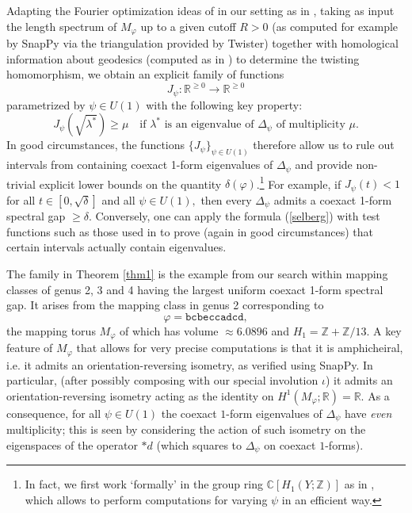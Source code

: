 \documentclass[11pt]{amsart}
\theoremstyle{definition}
\theoremstyle{remark}
\begin{document}
Adapting the Fourier optimization ideas of \cite{BS} in our setting as in \cite{LL1}, taking as input the length spectrum of $M_\varphi$ up to a given cutoff $R>0$ (as computed for example by SnapPy via the triangulation provided by Twister) together with homological information about geodesics (computed as in \cite{LL2}) to determine the twisting homomorphism, we obtain an explicit family of functions
\begin{equation*}
J_{\psi}:\mathbb{R}^{\geq0}\rightarrow \mathbb{R}^{\geq0}
\end{equation*}
parametrized by $\psi\in U(1)$ with the following key property:
\begin{equation*}
J_{\psi}(\sqrt{\lambda^*})\geq \mu\quad \text{if $\lambda^*$ is an eigenvalue of $\Delta_\psi$ of multiplicity $\mu$.}
\end{equation*}
In good circumstances, the functions $\{J_{\psi}\}_{\psi \in U(1)}$ therefore allow us to rule out intervals from containing coexact 1-form eigenvalues of $\Delta_\psi$ and provide non-trivial explicit lower bounds on the quantity $\delta(\varphi)$.\footnote{In fact, we first work `formally' in the group ring $\mathbb{C}[H_1(Y;\mathbb{Z})]$ as in \cite{LL4}, which allows to perform computations for varying $\psi$ in an efficient way.} For example, if $J_\psi(t) < 1$ for all $t \in [0,\sqrt{\delta}]$ and all $\psi \in U(1),$ then every $\Delta_\psi$ admits a coexact 1-form spectral gap $\geq \delta.$  Conversely, one can apply the formula (\ref{selberg}) with test functions such as those used in \cite{LL2} to prove (again in good circumstances) that certain intervals actually contain eigenvalues.
\\
\par
The family in Theorem \ref{thm1} is the example from our search within mapping classes of genus 2, 3 and 4 having the largest uniform coexact 1-form spectral gap. It arises from the mapping class in genus 2 corresponding to
\begin{equation*}
\varphi=\mathtt{bcbeccadcd},
\end{equation*}
the mapping torus $M_\varphi$ of which has volume $\approx 6.0896$ {and} $H_1=\mathbb{Z}+\mathbb{Z}/13$. A key feature of $M_\varphi$ that allows for very precise computations is that it is amphicheiral, i.e. it admits an orientation-reversing isometry, as verified using SnapPy. In particular, (after possibly composing with our special involution $\iota$) it admits an orientation-reversing isometry acting as the identity on $H^1(M_\varphi;\mathbb{R})=\mathbb{R}$. As a consequence, for all $\psi\in U(1)$ the coexact $1$-form eigenvalues of $\Delta_\psi$ have \textit{even} multiplicity; this is seen by considering the action of such isometry on the eigenspaces of the operator $\ast d$ (which squares to $\Delta_{\psi}$ on coexact $1$-forms).
\end{document}
